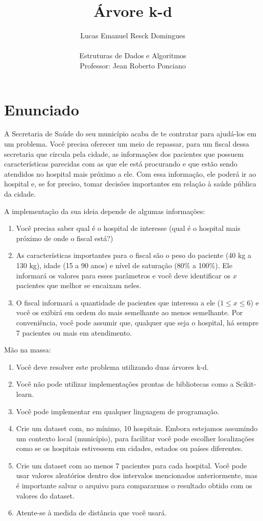 \documentclass{article}
\title{Árvore k-d}
\author{Lucas Emanuel Resck Domingues \\ \\
Estruturas de Dados e Algoritmos \\
Professor: Jean Roberto Ponciano}
\begin{document}
    \maketitle

    \section*{Enunciado}

    A Secretaria de Saúde do seu município acaba de te contratar para ajudá-los em um
    problema. Você precisa oferecer um meio de repassar, para um fiscal dessa secretaria que
    circula pela cidade, as informações dos pacientes que possuem características parecidas
    com as que ele está procurando e que estão sendo atendidos no hospital mais próximo a
    ele. Com essa informação, ele poderá ir ao hospital e, se for preciso, tomar decisões
    importantes em relação à saúde pública da cidade.
    
    A implementação da sua ideia depende de algumas informações:
    \begin{enumerate}
        \item Você precisa saber qual é o hospital de interesse (qual é o hospital mais próximo de onde o fiscal está?)
        \item As características importantes para o fiscal são o peso do paciente (40 kg a 130 kg), idade (15 a 90 anos) e nível de saturação (80\% a 100\%). Ele informará os valores para esses parâmetros e você deve identificar os $x$ pacientes que melhor se encaixam neles.
        \item O fiscal informará a quantidade de pacientes que interessa a ele ($1 \le x \le 6$) e você os exibirá em ordem do mais semelhante ao menos semelhante. Por conveniência, você pode assumir que, qualquer que seja o hospital, há sempre 7 pacientes ou mais em atendimento.
    \end{enumerate}

    Mão na massa:
    \begin{enumerate}
        \item Você deve resolver este problema utilizando duas árvores k-d.
        \item Você não pode utilizar implementações prontas de bibliotecas como a Scikit-learn.
        \item Você pode implementar em qualquer linguagem de programação.
        \item Crie um dataset com, no mínimo, 10 hospitais. Embora estejamos assumindo um     contexto local (município), para facilitar você pode escolher localizações como se os hospitais estivessem em cidades, estados ou países diferentes.
        \item Crie um dataset com ao menos 7 pacientes para cada hospital. Você pode usar valores aleatórios dentro dos intervalos mencionados anteriormente, mas é importante salvar o arquivo para compararmos o resultado obtido com os valores do dataset.
        \item Atente-se à medida de distância que você usará.
    \end{enumerate}

    \newpage

    

    
\end{document}
